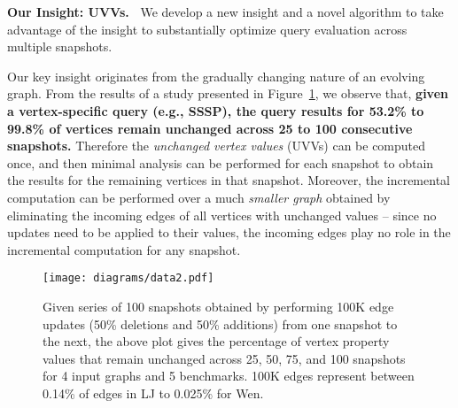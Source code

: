 
\vspace{0.05in}
\noindent
\textbf{Our Insight: UVVs.~} We develop a new insight and a novel algorithm to take advantage of the insight to substantially optimize query evaluation across multiple snapshots. 

Our key insight originates from the gradually changing nature of an evolving graph. From the results of a study presented in Figure~\ref{motivation1}, we observe that, \textbf{given a vertex-specific query (e.g., SSSP), the query results for 53.2\% to 99.8\% of vertices remain unchanged across  25 to 100 consecutive snapshots.} Therefore the \emph{unchanged vertex values} (UVVs) can be computed once, and then minimal analysis can be performed for each snapshot to obtain the results for the remaining vertices in that snapshot. Moreover, the incremental computation can be performed over a much \emph{smaller graph} obtained by eliminating the incoming edges of all vertices with unchanged values -- since no updates need to be applied to their values, the incoming edges play no role in the incremental computation for any snapshot.

 
\begin{figure}[!t]
    \centering
    \texttt{[image: diagrams/data2.pdf]}
    \vspace{-0.175in}
    \caption{Given series of 100 snapshots obtained by performing 100K edge updates (50\% deletions and 50\% additions) from one snapshot to the next, the above plot gives the percentage of vertex property values that remain unchanged across 25, 50, 75, and 100 snapshots for 4 input graphs and 5 benchmarks. 100K edges represent between 0.14\% of edges in LJ to 0.025\% for Wen.}
    \label{motivation1}
    \vspace{-0.175in}
\end{figure}

